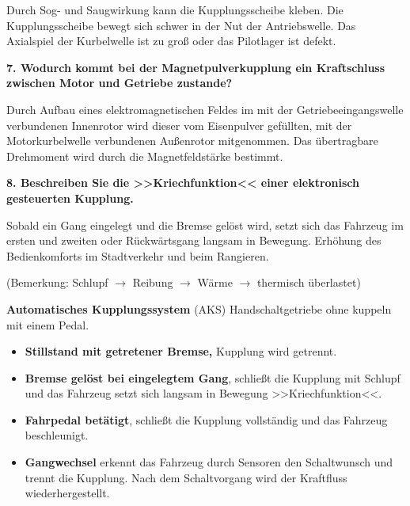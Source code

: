 Durch Sog- und Saugwirkung kann die Kupplungsscheibe kleben. Die
Kupplungsscheibe bewegt sich schwer in der Nut der Antriebswelle. Das
Axialspiel der Kurbelwelle ist zu groß oder das Pilotlager ist defekt.

\textbf{7. Wodurch kommt bei der Magnetpulverkupplung ein Kraftschluss
zwischen Motor und Getriebe zustande?}

Durch Aufbau eines elektromagnetischen Feldes im mit der
Getriebeeingangswelle verbundenen Innenrotor wird dieser vom Eisenpulver
gefüllten, mit der Motorkurbelwelle verbundenen Außenrotor mitgenommen.
Das übertragbare Drehmoment wird durch die Magnetfeldstärke bestimmt.

\textbf{8. Beschreiben Sie die >>Kriechfunktion<< einer elektronisch
gesteuerten Kupplung.}

Sobald ein Gang eingelegt und die Bremse gelöst wird, setzt sich das
Fahrzeug im ersten und zweiten oder Rückwärtsgang langsam in Bewegung.
Erhöhung des Bedienkomforts im Stadtverkehr und beim Rangieren.

(Bemerkung: Schlupf $\to$ Reibung $\to$ Wärme $\to$ thermisch
überlastet)

\textbf{Automatisches Kupplungssystem} (AKS) Handschaltgetriebe ohne
kuppeln mit einem Pedal.

\begin{itemize}
\item
  \textbf{Stillstand mit getretener Bremse,} Kupplung wird getrennt.
\item
  \textbf{Bremse gelöst bei eingelegtem Gang}, schließt die Kupplung mit
  Schlupf und das Fahrzeug setzt sich langsam in Bewegung
  >>Kriechfunktion<<.
\item
  \textbf{Fahrpedal betätigt}, schließt die Kupplung vollständig und das
  Fahrzeug beschleunigt.
\item
  \textbf{Gangwechsel} erkennt das Fahrzeug durch Sensoren den
  Schaltwunsch und trennt die Kupplung. Nach dem Schaltvorgang wird der
  Kraftfluss wiederhergestellt.
\end{itemize}
